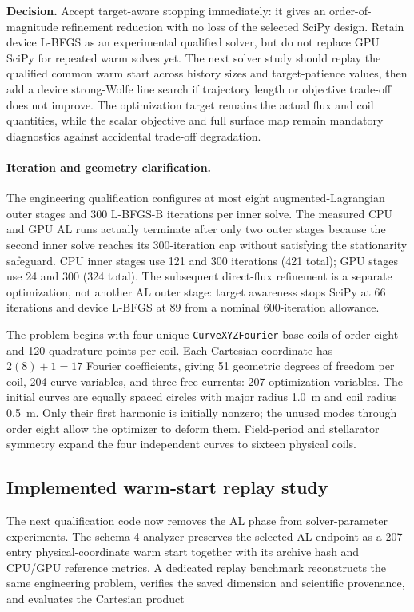 \documentclass[11pt,a4paper]{article}
\newcommand{\code}[1]{\texttt{#1}}
\begin{document}
\textbf{Decision.}  Accept target-aware stopping immediately: it gives an
order-of-magnitude refinement reduction with no loss of the selected SciPy
design.  Retain device L-BFGS as an experimental qualified solver, but do not
replace GPU SciPy for repeated warm solves yet.  The next solver study should
replay the qualified common warm start across history sizes and target-patience
values, then add a device strong-Wolfe line search if trajectory length or
objective trade-off does not improve.  The optimization target remains the
actual flux and coil quantities, while the scalar objective and full surface
map remain mandatory diagnostics against accidental trade-off degradation.

\paragraph{Iteration and geometry clarification.}
The engineering qualification configures at most eight augmented-Lagrangian
outer stages and 300 L-BFGS-B iterations per inner solve.  The measured CPU and
GPU AL runs actually terminate after only two outer stages because the second
inner solve reaches its 300-iteration cap without satisfying the stationarity
safeguard.  CPU inner stages use 121 and 300 iterations (421 total); GPU stages
use 24 and 300 (324 total).  The subsequent direct-flux refinement is a separate
optimization, not another AL outer stage: target awareness stops SciPy at 66
iterations and device L-BFGS at 89 from a nominal 600-iteration allowance.

The problem begins with four unique \code{CurveXYZFourier} base coils of order
eight and 120 quadrature points per coil.  Each Cartesian coordinate has
$2(8)+1=17$ Fourier coefficients, giving 51 geometric degrees of freedom per
coil, 204 curve variables, and three free currents: 207 optimization variables.
The initial curves are equally spaced circles with major radius 1.0~m and coil
radius 0.5~m.  Only their first harmonic is initially nonzero; the unused modes
through order eight allow the optimizer to deform them.  Field-period and
stellarator symmetry expand the four independent curves to sixteen physical
coils.

\subsection{Implemented warm-start replay study}

The next qualification code now removes the AL phase from solver-parameter
experiments.  The schema-4 analyzer preserves the selected AL endpoint as a
207-entry physical-coordinate warm start together with its archive hash and
CPU/GPU reference metrics.  A dedicated replay benchmark reconstructs the
same engineering problem, verifies the saved dimension and scientific
provenance, and evaluates the Cartesian product
\end{document}
